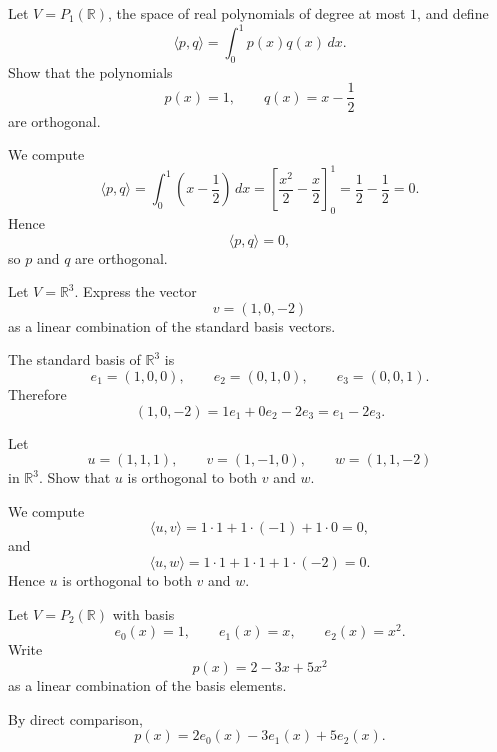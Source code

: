 \documentclass{article}
\begin{document}
\begin{exercise}
Let $V=P_1(\mathbb{R})$, the space of real polynomials of degree at most $1$, and define
$$
\langle p,q\rangle=\int_0^1 p(x)q(x)\,dx.
$$
Show that the polynomials
$$
p(x)=1,\qquad q(x)=x-\frac12
$$
are orthogonal.
\end{exercise}

\begin{solution}
We compute
$$
\langle p,q\rangle=\int_0^1 \left(x-\frac12\right)\,dx
=\left[\frac{x^2}{2}-\frac{x}{2}\right]_0^1
=\frac12-\frac12=0.
$$
Hence
$$
\langle p,q\rangle=0,
$$
so $p$ and $q$ are orthogonal.
\end{solution}

\begin{exercise}
Let $V=\mathbb{R}^3$. Express the vector
$$
v=(1,0,-2)
$$
as a linear combination of the standard basis vectors.
\end{exercise}

\begin{solution}
The standard basis of $\mathbb{R}^3$ is
$$
e_1=(1,0,0),\qquad e_2=(0,1,0),\qquad e_3=(0,0,1).
$$
Therefore
$$
(1,0,-2)=1e_1+0e_2-2e_3=e_1-2e_3.
$$
\end{solution}

\begin{exercise}
Let
$$
u=(1,1,1),\qquad v=(1,-1,0),\qquad w=(1,1,-2)
$$
in $\mathbb{R}^3$. Show that $u$ is orthogonal to both $v$ and $w$.
\end{exercise}

\begin{solution}
We compute
$$
\langle u,v\rangle=1\cdot 1+1\cdot(-1)+1\cdot 0=0,
$$
and
$$
\langle u,w\rangle=1\cdot 1+1\cdot 1+1\cdot(-2)=0.
$$
Hence $u$ is orthogonal to both $v$ and $w$.
\end{solution}

\begin{exercise}
Let $V=P_2(\mathbb{R})$ with basis
$$
e_0(x)=1,\qquad e_1(x)=x,\qquad e_2(x)=x^2.
$$
Write
$$
p(x)=2-3x+5x^2
$$
as a linear combination of the basis elements.
\end{exercise}

\begin{solution}
By direct comparison,
$$
p(x)=2e_0(x)-3e_1(x)+5e_2(x).
$$
\end{solution}
\end{document}
